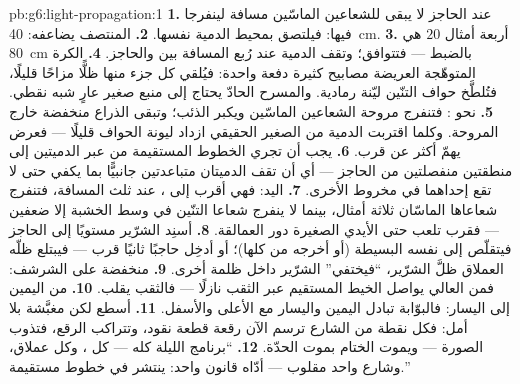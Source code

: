 \begin{solution}{pb:g6:light-propagation:1}
\textbf{1.} عند الحاجز لا يبقى للشعاعين الماسّين مسافة
لينفرجا فيها: فيلتصق  بمحيط الدمية نفسها.
\textbf{2.} المنتصف يضاعفه: \qty{40}{cm}.
\textbf{3.} أربعة أمثال $20$ هي \qty{80}{cm} بالضبط ---
فتتوافق؛ وتقف الدمية عند رُبع المسافة بين  والحاجز.
\textbf{4.} الكرة المتوهّجة العريضة مصابيح كثيرة دفعة واحدة:
فيُلقي كل جزء منها ظلًّا مزاحًا قليلًا، فتُلطَّخ حواف التنّين
ليّنة رمادية. والمسرح الحادّ يحتاج إلى منبع صغير عارٍ شبه
نقطي.
\textbf{5.} نحو : فتنفرج مروحة الشعاعين الماسّين ويكبر
الذئب؛ وتبقى الذراع منخفضة خارج المروحة. وكلما اقتربت الدمية من
 الصغير الحقيقي ازداد ليونة الحواف قليلًا --- فعرض
 يهمّ أكثر عن قرب.
\textbf{6.} يجب أن تجري الخطوط المستقيمة من  عبر
الدميتين إلى منطقتين منفصلتين من الحاجز --- أي أن تقف الدميتان
متباعدتين جانبيًّا بما يكفي حتى لا تقع إحداهما في مخروط 
الأخرى.
\textbf{7.}  اليد: فهي أقرب إلى ، عند ثلث المسافة،
فتنفرج شعاعاها الماسّان ثلاثة أمثال، بينما لا ينفرج شعاعا
التنّين في وسط الخشبة إلا ضعفين --- فقرب  تلعب حتى
الأيدي الصغيرة دور العمالقة.
\textbf{8.} أسنِد الشرّير مستويًا إلى الحاجز فيتقلّص إلى نفسه
البسيطة (أو أخرجه من  كلها)؛ أو أدخِل حاجبًا ثانيًا قرب
 --- فيبتلع ظلّه العملاق ظلَّ الشرّير، ``فيختفي''
الشرّير داخل ظلمة أخرى.
\textbf{9.} منخفضة على الشرشف: فمن  العالي يواصل الخيط
المستقيم عبر الثقب نازلًا --- فالثقب يقلب.
\textbf{10.} من اليمين إلى اليسار: فالبوّابة تبادل اليمين
واليسار مع الأعلى والأسفل.
\textbf{11.} أسطع لكن مغبَّشة بلا أمل: فكل نقطة من الشارع ترسم
الآن رقعة  قطعة نقود، وتتراكب الرقع، فتذوب الصورة ---
ويموت الختام بموت الحدّة.
\textbf{12.} ``برنامج الليلة كله --- كل ، وكل عملاق، وشارع
واحد مقلوب --- أدّاه قانون واحد:  ينتشر في خطوط
مستقيمة.''
\end{solution}
